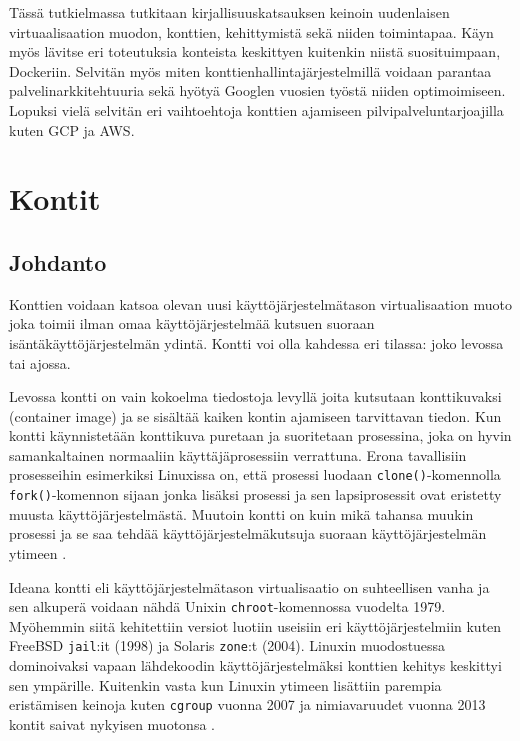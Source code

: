 \documentclass[finnish]{tktltiki2}
\theoremstyle{definition}
\theoremstyle{remark}
\begin{document}
Tässä tutkielmassa tutkitaan kirjallisuuskatsauksen keinoin uudenlaisen virtuaalisaation muodon, konttien, kehittymistä sekä niiden toimintapaa. Käyn myös lävitse eri toteutuksia konteista keskittyen kuitenkin niistä suosituimpaan, Dockeriin. Selvitän myös miten konttienhallintajärjestelmillä voidaan parantaa palvelinarkkitehtuuria sekä hyötyä Googlen vuosien työstä niiden optimoimiseen. Lopuksi vielä selvitän eri vaihtoehtoja konttien ajamiseen pilvipalveluntarjoajilla kuten GCP ja AWS.

\section{Kontit}

\subsection{Johdanto}

Konttien voidaan katsoa olevan uusi käyttöjärjestelmätason virtualisaation muoto joka toimii ilman omaa käyttöjärjestelmää kutsuen suoraan isäntäkäyttöjärjestelmän ydintä. Kontti voi olla kahdessa eri tilassa: joko levossa tai ajossa.

Levossa kontti on vain kokoelma tiedostoja levyllä joita kutsutaan konttikuvaksi (container image) ja se sisältää kaiken kontin ajamiseen tarvittavan tiedon. Kun kontti käynnistetään konttikuva puretaan ja suoritetaan prosessina, joka on hyvin samankaltainen normaaliin käyttäjäprosessiin verrattuna. Erona tavallisiin prosesseihin esimerkiksi Linuxissa on, että prosessi luodaan \texttt{clone()}-komennolla \texttt{fork()}-komennon sijaan jonka lisäksi prosessi ja sen lapsiprosessit ovat eristetty muusta käyttöjärjestelmästä. Muutoin kontti on kuin mikä tahansa muukin prosessi ja se saa tehdää käyttöjärjestelmäkutsuja suoraan käyttöjärjestelmän ytimeen \cite{docker}.

Ideana kontti eli käyttöjärjestelmätason virtualisaatio on suhteellisen vanha ja sen alkuperä voidaan nähdä Unixin \texttt{chroot}-komennossa vuodelta 1979. Myöhemmin siitä kehitettiin versiot luotiin useisiin eri käyttöjärjestelmiin kuten FreeBSD \texttt{jail}:it (1998) ja Solaris \texttt{zone}:t (2004). Linuxin muodostuessa dominoivaksi vapaan lähdekoodin käyttöjärjestelmäksi konttien kehitys keskittyi sen ympärille. Kuitenkin vasta kun Linuxin ytimeen lisättiin parempia eristämisen keinoja kuten \texttt{cgroup} vuonna 2007 ja nimiavaruudet vuonna 2013 kontit saivat nykyisen muotonsa \cite{lxc-docker-kubernetes}.
\end{document}
